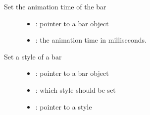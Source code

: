 \documentclass[letterpaper,10pt,english]{sphinxmanual}
\begin{document}

\begin{fulllineitems}
\label{\detokenize{object-types/bar:_CPPv420lv_bar_set_anim_timeP8lv_obj_t8uint16_t}}%
\pysigstartmultiline
{}\label{\detokenize{object-types/bar:lv__bar_8h_1aa7b620ec46f93c0005bea65260a6e5f8}}%
\pysigstopmultiline
Set the animation time of the bar \begin{description}
\item[{}] \leavevmode\begin{itemize}
\item {} 
: pointer to a bar object 

\item {} 
: the animation time in milliseconds. 

\end{itemize}

\end{description}


\end{fulllineitems}


\begin{fulllineitems}
\label{\detokenize{object-types/bar:_CPPv416lv_bar_set_styleP8lv_obj_t14lv_bar_style_tPK10lv_style_t}}%
\pysigstartmultiline
{}\label{\detokenize{object-types/bar:lv__bar_8h_1a4f919e7ed772bacd08302b6bec78fb1f}}%
\pysigstopmultiline
Set a style of a bar \begin{description}
\item[{}] \leavevmode\begin{itemize}
\item {} 
: pointer to a bar object 

\item {} 
: which style should be set 

\item {} 
: pointer to a style 

\end{itemize}

\end{description}


\end{fulllineitems}
\end{document}
